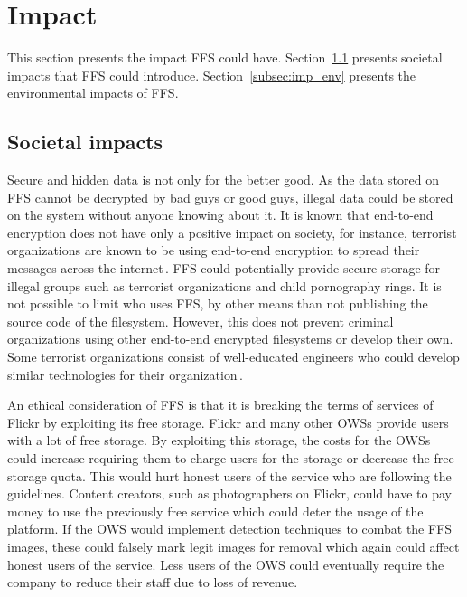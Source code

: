 \section{Impact}
\label{sec:imp}
This section presents the impact \gls{FFS} could have. Section~\ref{subsec:imp_soc} presents societal impacts that \gls{FFS} could introduce. Section~\ref{subsec:imp_env} presents the environmental impacts of \gls{FFS}.

\subsection{Societal impacts}
\label{subsec:imp_soc}
Secure and hidden data is not only for the better good. As the data stored on \gls{FFS} cannot be decrypted by bad guys or good guys, illegal data could be stored on the system without anyone knowing about it. It is known that \mbox{end-to-end} encryption does not have only a positive impact on society, for instance, terrorist organizations are known to be using \mbox{end-to-end} encryption to spread their messages across the internet\,\cite{ruddEncryptionCounterterrorismGetting2017}. \gls{FFS} could potentially provide secure storage for illegal groups such as terrorist organizations and child pornography rings. It is not possible to limit who uses \gls{FFS}, by other means than not publishing the source code of the filesystem. However, this does not prevent criminal organizations using other \mbox{end-to-end} encrypted filesystems or develop their own. Some terrorist organizations consist of \mbox{well-educated} engineers who could develop similar technologies for their organization\,\cite{berrebyEngineeringTerror2010}.

An ethical consideration of \gls{FFS} is that it is breaking the terms of services of Flickr by exploiting its free storage. Flickr and many other \gls{OWS}s provide users with a lot of free storage. By exploiting this storage, the costs for the \gls{OWS}s could increase requiring them to charge users for the storage or decrease the free storage quota. This would hurt honest users of the service who are following the guidelines. Content creators, such as photographers on Flickr, could have to pay money to use the previously free service which could deter the usage of the platform. If the \gls{OWS} would implement detection techniques to combat the \gls{FFS} images, these could falsely mark legit images for removal which again could affect honest users of the service. Less users of the \gls{OWS} could eventually require the company to reduce their staff due to loss of revenue. 

